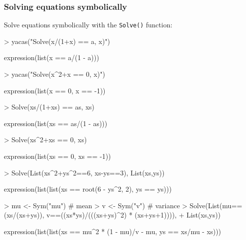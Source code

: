 \documentclass[10pt]{article}
\newcommand{\code}[1]{{\tt #1}}
\begin{document}
\subsubsection{Solving equations symbolically}

Solve equations symbolically with the \code{Solve()} function:
\begin{Schunk}
\begin{Sinput}
> yacas("Solve(x/(1+x) == a, x)")
\end{Sinput}
\begin{Soutput}
expression(list(x == a/(1 - a)))
\end{Soutput}
\begin{Sinput}
> yacas("Solve(x^2+x == 0, x)")
\end{Sinput}
\begin{Soutput}
expression(list(x == 0, x == -1))
\end{Soutput}
\end{Schunk}

\begin{Schunk}
\begin{Sinput}
> Solve(xs/(1+xs) == as, xs)
\end{Sinput}
\begin{Soutput}
expression(list(xs == as/(1 - as)))
\end{Soutput}
\begin{Sinput}
> Solve(xs^2+xs == 0, xs)
\end{Sinput}
\begin{Soutput}
expression(list(xs == 0, xs == -1))
\end{Soutput}
\end{Schunk}

\begin{Schunk}
\begin{Sinput}
> Solve(List(xs^2+ys^2==6, xs-ys==3), List(xs,ys))
\end{Sinput}
\begin{Soutput}
expression(list(list(xs == root(6 - ys^2, 2), ys == ys)))
\end{Soutput}
\end{Schunk}

\begin{Schunk}
\begin{Sinput}
> mu <- Sym("mu") # mean
> v <- Sym("v") # variance
> Solve(List(mu==(xs/(xs+ys)), v==((xs*ys)/(((xs+ys)^2) * (xs+ys+1)))),
+     List(xs,ys))
\end{Sinput}
\begin{Soutput}
expression(list(list(xs == mu^2 * (1 - mu)/v - mu, ys == xs/mu - 
    xs)))
\end{Soutput}
\end{Schunk}
\end{document}
